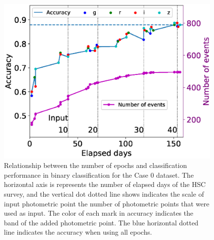 \documentclass[proof]{pasj01}
\providecommand{\DIFadd}[1]{{\protect\color{blue} \sf #1}} %
\providecommand{\DIFdel}[1]{{\protect\color{red} \scriptsize #1}} %
\providecommand{\DIFaddFL}[1]{\DIFadd{#1}} %
\providecommand{\DIFdelFL}[1]{\DIFdel{#1}} %
\providecommand{\DIFaddbeginFL}{} %
\providecommand{\DIFaddendFL}{} %
\providecommand{\DIFdelbeginFL}{} %
\providecommand{\DIFdelendFL}{} %
\newcommand{\DIFscaledelfig}{0.5}
\newlength{\DIFdelgraphicswidth} %
\newlength{\DIFdelgraphicsheight} %
\newcommand{\DIFaddincludegraphics}[2][]{{\color{blue}\fbox{\DIFOincludegraphics[#1]{#2}}}} %
\newcommand{\DIFdelincludegraphics}[2][]{%
\sbox{\DIFdelgraphicsbox}{\DIFOincludegraphics[#1]{#2}}%
\settoboxwidth{\DIFdelgraphicswidth}{\DIFdelgraphicsbox} %
\settoboxtotalheight{\DIFdelgraphicsheight}{\DIFdelgraphicsbox} %
\scalebox{\DIFscaledelfig}{%
\parbox[b]{\DIFdelgraphicswidth}{\usebox{\DIFdelgraphicsbox}\\[-\baselineskip] \rule{\DIFdelgraphicswidth}{0em}}\llap{\resizebox{\DIFdelgraphicswidth}{\DIFdelgraphicsheight}{%
\setlength{\unitlength}{\DIFdelgraphicswidth}%
\begin{picture}(1,1)%
\thicklines\linethickness{2pt} %
{\color[rgb]{1,0,0}\put(0,0){\framebox(1,1){}}}%
{\color[rgb]{1,0,0}\put(0,0){\line( 1,1){1}}}%
{\color[rgb]{1,0,0}\put(0,1){\line(1,-1){1}}}%
\end{picture}%
}\hspace*{3pt}}} %
} %
\DeclareRobustCommand{\DIFaddbeginFL}{\DIFOaddbeginFL \let\includegraphics\DIFaddincludegraphics} %
\DeclareRobustCommand{\DIFaddendFL}{\DIFOaddendFL \let\includegraphics\DIFOincludegraphics} %
\DeclareRobustCommand{\DIFdelbeginFL}{\DIFOdelbeginFL \let\includegraphics\DIFdelincludegraphics} %
\DeclareRobustCommand{\DIFdelendFL}{\DIFOaddendFL \let\includegraphics\DIFOincludegraphics} %
\begin{document}
\begin{figure}[htbp]
  \begin{center}
     \includegraphics[width=\columnwidth]{figures/n_observations_v2_case0.eps}
  \end{center}
  \caption{%
  Relationship between the number of epochs and classification performance in binary classification for the Case 0 dataset. 
  The horizontal axis \DIFdelbeginFL \DIFdelFL{is }\DIFdelendFL \DIFaddbeginFL \DIFaddFL{represents }\DIFaddendFL the \DIFaddbeginFL \DIFaddFL{number of }\DIFaddendFL elapsed days of the HSC survey, and the vertical \DIFdelbeginFL \DIFdelFL{dot }\DIFdelendFL \DIFaddbeginFL \DIFaddFL{dotted }\DIFaddendFL line \DIFdelbeginFL \DIFdelFL{shows }\DIFdelendFL \DIFaddbeginFL \DIFaddFL{indicates }\DIFaddendFL the scale of \DIFdelbeginFL \DIFdelFL{input photometric point }\DIFdelendFL \DIFaddbeginFL \DIFaddFL{the }\DIFaddendFL number \DIFaddbeginFL \DIFaddFL{of photometric points that were used as input}\DIFaddendFL . 
  The color of each mark in accuracy indicates the band of the added photometric point. 
  The blue horizontal dotted line indicates the accuracy when using all epochs.
  }%
  \label{fig:n_observations}
\end{figure}
%
\end{document}
